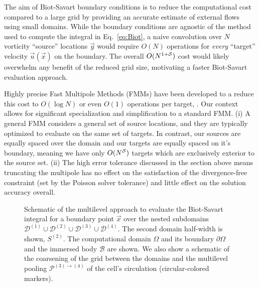 \documentclass[final,1p,times]{elsarticle}
\begin{document}
The aim of Biot-Savart boundary conditions is to reduce the computational cost compared to a large grid by providing an accurate estimate of external flows using small domains. While the boundary conditions are agnostic of the method used to compute the integral in Eq.~\ref{eq:Biot}, a naive convolution over $N$ vorticity ``source'' locations $\vec y$ would require $O(N)$ operations for \textit{every} ``target'' velocity $\vec u(\vec x)$ on the boundary. The overall $O(N^{1+\cal S})$ cost would likely overwhelm any benefit of the reduced grid size, motivating a faster Biot-Savart evaluation approach.


Highly precise Fast Multipole Methods (FMMs) have been developed to a reduce this cost to $O(\log N)$ or even $O(1)$ operations per target, \cite{Greencard1987ASimulations,Ying2004ADimensions, Fong2009TheMethod}. Our context allows for significant specialization and simplification to a standard FMM. (i) A general FMM considers a general set of source locations, and they are typically optimized to evaluate on the same set of targets. In contrast, our sources are equally spaced over the domain and our targets are equally spaced on it's boundary, meaning we have only $O(N^{\cal S})$ targets which are exclusively exterior to the source set. (ii) The high error tolerance discussed in the section above means truncating the multipole has no effect on the satisfaction of the divergence-free constraint (set by the Poisson solver tolerance) and little effect on the solution accuracy overall.

\begin{figure}
    \centering
    \def\svgwidth{0.7\columnwidth}
    
    \caption{Schematic of the multilevel approach to evaluate the Biot-Savart integral for a boundary point $\vec x$ over the nested subdomains $\mathcal{D}^{(1)} \cup \mathcal{D}^{(2)} \cup \mathcal{D}^{(3)} \cup \mathcal{D}^{(4)}$. The second domain half-width is shown, ${S}^{(2)}$. The computational domain $\Omega$ and its boundary $\partial\Omega$ and the immersed body $\mathcal{B}$ are shown. We also show a schematic of the coarsening of the grid between the domains and the multilevel pooling $\mathcal{P}^{(3)\to(4)}$ of the cell's circulation (circular-colored markers). 
    }
    \label{Fig_2}
\end{figure}
\end{document}
